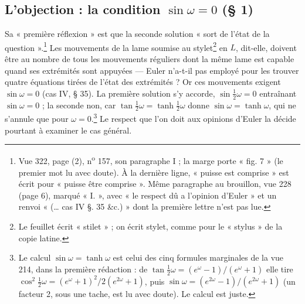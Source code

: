 \documentclass[11pt,a4paper]{article}
\begin{document}
\subsection*{L'objection : la condition $\sin\omega = 0$ (§ 1)}

Sa « première réflexion » est que la seconde solution « sort de l'état de la question ».\footnote{Vue 322, page (2), n\textsuperscript{o} 157, son paragraphe I ; la marge porte « fig. 7 » (le premier mot lu avec doute). À la dernière ligne, « puisse est comprise » est écrit pour « puisse être comprise ». Même paragraphe au brouillon, vue 228 (page 6), marqué « I. », avec « le respect dû a l'opinion d'Euler » et un renvoi « (… cas IV §. 35 \&c.) » dont la première lettre n'est pas lue.} Les mouvements de la lame soumise au stylet\footnote{Le feuillet écrit « stilet » ; on écrit stylet, comme pour le « stylus » de la copie latine.} en $L$, dit-elle, doivent être au nombre de tous les mouvements réguliers dont la même lame est capable quand ses extrémités sont appuyées — Euler n'a-t-il pas employé pour les trouver quatre équations tirées de l'état des extrémités ? Or ces mouvements exigent $\sin\omega=0$ (cas IV, § 35). La première solution s'y accorde, $\sin\frac12\omega=0$ entraînant $\sin\omega=0$ ; la seconde non, car $\tan\frac12\omega=\tanh\frac12\omega$ donne $\sin\omega=\tanh\omega$, qui ne s'annule que pour $\omega=0$.\footnote{Le calcul $\sin\omega=\tanh\omega$ est celui des cinq formules marginales de la vue 214, dans la première rédaction : de $\tan\frac12\omega=(e^\omega-1)/(e^\omega+1)$ elle tire $\cos^2\frac12\omega=(e^\omega+1)^2/2(e^{2\omega}+1)$, puis $\sin\omega=(e^{2\omega}-1)/(e^{2\omega}+1)$ (un facteur 2, sous une tache, est lu avec doute). Le calcul est juste.} Le respect que l'on doit aux opinions d'Euler la décide pourtant à examiner le cas général.
\end{document}
